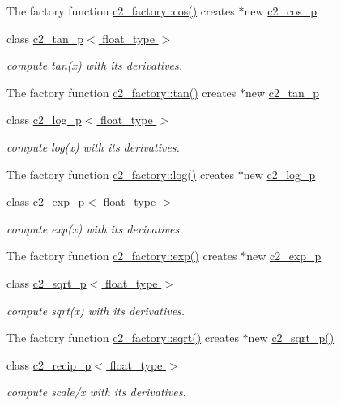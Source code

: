 \begin{DoxyCompactItemize}
\begin{DoxyCompactList}
The factory function \hyperlink{classc2__factory_abc5ea51417ecef590629a39f7a2227e4}{c2\+\_\+factory\+::cos()} creates $\ast$new \hyperlink{classc2__cos__p}{c2\+\_\+cos\+\_\+p} \end{DoxyCompactList}\item 
class \hyperlink{classc2__tan__p}{c2\+\_\+tan\+\_\+p$<$ float\+\_\+type $>$}
\begin{DoxyCompactList}\small\item\em compute tan(x) with its derivatives.

The factory function \hyperlink{classc2__factory_a2f83cbd3be646166f7e3bef1e27244b9}{c2\+\_\+factory\+::tan()} creates $\ast$new \hyperlink{classc2__tan__p}{c2\+\_\+tan\+\_\+p} \end{DoxyCompactList}\item 
class \hyperlink{classc2__log__p}{c2\+\_\+log\+\_\+p$<$ float\+\_\+type $>$}
\begin{DoxyCompactList}\small\item\em compute log(x) with its derivatives.

The factory function \hyperlink{classc2__factory_af20c7c4fee421c8ee0b51bac1c42302e}{c2\+\_\+factory\+::log()} creates $\ast$new \hyperlink{classc2__log__p}{c2\+\_\+log\+\_\+p} \end{DoxyCompactList}\item 
class \hyperlink{classc2__exp__p}{c2\+\_\+exp\+\_\+p$<$ float\+\_\+type $>$}
\begin{DoxyCompactList}\small\item\em compute exp(x) with its derivatives.

The factory function \hyperlink{classc2__factory_ad6c29a455b386c1971e6614f6962f3da}{c2\+\_\+factory\+::exp()} creates $\ast$new \hyperlink{classc2__exp__p}{c2\+\_\+exp\+\_\+p} \end{DoxyCompactList}\item 
class \hyperlink{classc2__sqrt__p}{c2\+\_\+sqrt\+\_\+p$<$ float\+\_\+type $>$}
\begin{DoxyCompactList}\small\item\em compute sqrt(x) with its derivatives.

The factory function \hyperlink{classc2__factory_a5b189f66ec65267f3812cdc45ccf072d}{c2\+\_\+factory\+::sqrt()} creates $\ast$new \hyperlink{classc2__sqrt__p_a780a0f48a8fb428b2cb9fac74b7b56e7}{c2\+\_\+sqrt\+\_\+p()} \end{DoxyCompactList}\item 
class \hyperlink{classc2__recip__p}{c2\+\_\+recip\+\_\+p$<$ float\+\_\+type $>$}
\begin{DoxyCompactList}\small\item\em compute scale/x with its derivatives.


\end{DoxyCompactList}
\end{DoxyCompactItemize}
